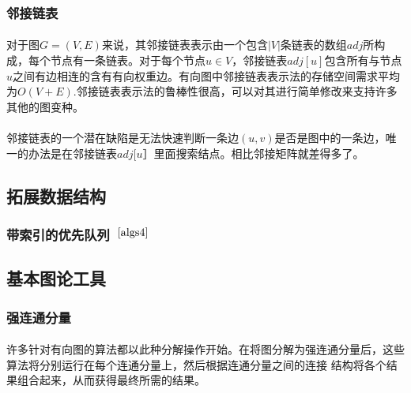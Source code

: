 \documentclass[UTF8,a4paper]{ctexart}
\begin{document}
\subsubsection{邻接链表}
\paragraph{}对于图$G=(V,E)$来说，其邻接链表表示由一个包含$|V|$条链表的数组$adj$所构成，每个节点有一条链表。对于每个节点$u\in V$，邻接链表$adj[u]$包含所有与节点$u$之间有边相连的含有有向权重边。有向图中邻接链表表示法的存储空间需求平均为$O(V+E)$.邻接链表表示法的鲁棒性很高，可以对其进行简单修改来支持许多其他的图变种。
\paragraph{}邻接链表的一个潜在缺陷是无法快速判断一条边$(u, v)$是否是图中的一条边，唯一的办法是在邻接链表$adj[u］$里面搜索结点。相比邻接矩阵就差得多了。

\subsection{拓展数据结构}
\subsubsection{带索引的优先队列~$^{\cite{algs4}}$}\label{sec:indexedpq}
\paragraph{}


\subsection{基本图论工具}
\subsubsection{强连通分量}\label{sec:scc}
\paragraph{}许多针对有向图的算法都以此种分解操作开始。在将图分解为强连通分量后，这些算法将分别运行在每个连通分量上，然后根据连通分量之间的连接 结构将各个结果组合起来，从而获得最终所需的结果。
\end{document}
